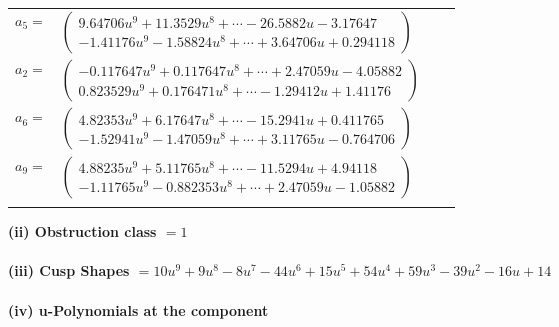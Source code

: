 \documentclass[1p]{elsarticle_modified}
\theoremstyle{definition}
\begin{document}
\begin{tabular}{m{7pt} m{180pt} m{7pt} m{180pt} }
\flushright $a_{5}=$&$\begin{pmatrix}9.64706 u^{9}+11.3529 u^{8}+\cdots-26.5882 u-3.17647\\-1.41176 u^{9}-1.58824 u^{8}+\cdots+3.64706 u+0.294118\end{pmatrix}$ \\
\flushright $a_{2}=$&$\begin{pmatrix}-0.117647 u^{9}+0.117647 u^{8}+\cdots+2.47059 u-4.05882\\0.823529 u^{9}+0.176471 u^{8}+\cdots-1.29412 u+1.41176\end{pmatrix}$ \\
\flushright $a_{6}=$&$\begin{pmatrix}4.82353 u^{9}+6.17647 u^{8}+\cdots-15.2941 u+0.411765\\-1.52941 u^{9}-1.47059 u^{8}+\cdots+3.11765 u-0.764706\end{pmatrix}$ \\
\flushright $a_{9}=$&$\begin{pmatrix}4.88235 u^{9}+5.11765 u^{8}+\cdots-11.5294 u+4.94118\\-1.11765 u^{9}-0.882353 u^{8}+\cdots+2.47059 u-1.05882\end{pmatrix}$\\&\end{tabular}
\flushleft \textbf{(ii) Obstruction class $= 1$}\\~\\
\flushleft \textbf{(iii) Cusp Shapes $= 10 u^9+9 u^8-8 u^7-44 u^6+15 u^5+54 u^4+59 u^3-39 u^2-16 u+14$}\\~\\
\newpage\renewcommand{\arraystretch}{1}
\flushleft \textbf{(iv) u-Polynomials at the component}\newline \\
\end{document}
